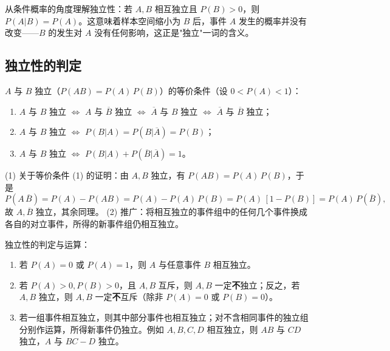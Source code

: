 ﻿\documentclass[lang=cn,11pt]{elegantbook}
\begin{document}
\begin{note}
从条件概率的角度理解独立性：若 \(A, B\) 相互独立且 \(P(B) > 0\)，则 \(P(A|B) = P(A)\)。这意味着样本空间缩小为 \(B\) 后，事件 \(A\) 发生的概率并没有改变——\(B\) 的发生对 \(A\) 没有任何影响，这正是"独立"一词的含义。
\end{note}

\subsection{独立性的判定}

\begin{property}\label{prop:independence-equiv}
\(A\) 与 \(B\) 独立（\(P(AB)=P(A)\,P(B)\)）的等价条件（设 \(0 < P(A) < 1\)）：
\begin{enumerate}
    \item \(A\) 与 \(B\) 独立 \(\Leftrightarrow\) \(A\) 与 \(\overline{B}\) 独立 \(\Leftrightarrow\) \(\overline{A}\) 与 \(B\) 独立 \(\Leftrightarrow\) \(\overline{A}\) 与 \(\overline{B}\) 独立；
    \item \(A\) 与 \(B\) 独立 \(\Leftrightarrow\) \(P(B|A) = P(B|\overline{A}) = P(B)\)；
    \item \(A\) 与 \(B\) 独立 \(\Leftrightarrow\) \(P(B|A) + P(\overline{B}|\overline{A}) = 1\)。
\end{enumerate}
\end{property}

\begin{remark}
(1) 关于等价条件 (1) 的证明：由 \(A, B\) 独立，有 \(P(AB)=P(A)\,P(B)\)，于是
\[
P(A\,\overline{B}) = P(A) - P(AB) = P(A) - P(A)\,P(B) = P(A)\,[1-P(B)] = P(A)\,P(\overline{B}),
\]
故 \(A, \overline{B}\) 独立，其余同理。\newline
(2) 推广：将相互独立的事件组中的任何几个事件换成各自的对立事件，所得的新事件组仍相互独立。
\end{remark}

\begin{property}\label{prop:independence-compute}
独立性的判定与运算：
\begin{enumerate}
    \item 若 \(P(A)=0\) 或 \(P(A)=1\)，则 \(A\) 与任意事件 \(B\) 相互独立。
    \item 若 \(P(A)>0, P(B)>0\)，且 \(A, B\) 互斥，则 \(A, B\) 一定\textbf{不}独立；反之，若 \(A, B\) 独立，则 \(A, B\) 一定\textbf{不}互斥（除非 \(P(A)=0\) 或 \(P(B)=0\)）。
    \item 若一组事件相互独立，则其中部分事件也相互独立；对不含相同事件的独立组分别作运算，所得新事件仍独立。例如 \(A, B, C, D\) 相互独立，则 \(AB\) 与 \(CD\) 独立，\(A\) 与 \(BC-D\) 独立。
\end{enumerate}
\end{property}
\end{document}
